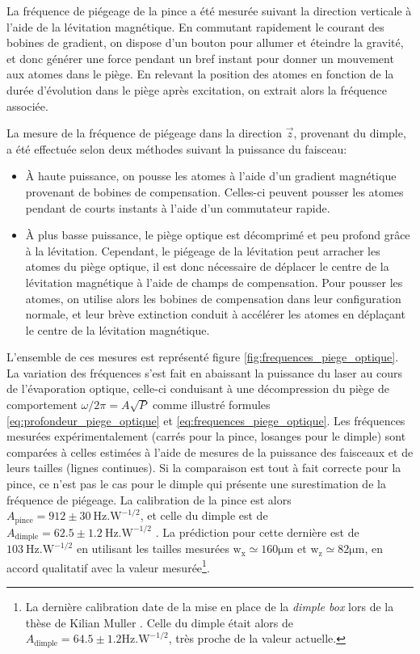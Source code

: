 La fréquence de piégeage de la pince a été mesurée suivant la direction verticale à l'aide de la lévitation magnétique. En commutant rapidement le courant des bobines de gradient, on dispose d'un bouton pour allumer et éteindre la gravité, et donc générer une force pendant un bref instant pour donner un mouvement aux atomes dans le piège. En relevant la position des atomes en fonction de la durée d'évolution dans le piège après excitation, on extrait alors la fréquence associée.

La mesure de la fréquence de piégeage dans la direction $\vec{z}$, provenant du dimple, a été effectuée selon deux méthodes suivant la puissance du faisceau:
\begin{itemize}
\item[\textendash] À haute puissance, on pousse les atomes à l'aide d'un gradient magnétique provenant de bobines de compensation. Celles-ci peuvent pousser les atomes pendant de courts instants à l'aide d'un commutateur rapide.
\item[\textendash] À plus basse puissance, le piège optique est décomprimé et peu profond grâce à la lévitation. Cependant, le piégeage de la lévitation peut arracher les atomes du piège optique, il est donc nécessaire de déplacer le centre de la lévitation magnétique à l'aide de champs de compensation. Pour pousser les atomes, on utilise alors les bobines de compensation dans leur configuration normale, et leur brève extinction conduit à accélérer les atomes en déplaçant le centre de la lévitation magnétique.
\end{itemize}

L'ensemble de ces mesures est représenté figure \ref{fig:frequences_piege_optique}. La variation des fréquences s'est fait en abaissant la puissance du laser au cours de l'évaporation optique, celle-ci conduisant à une décompression du piège de comportement $\omega /2\pi =A \sqrt{P}$ comme illustré formules \ref{eq:profondeur_piege_optique} et \ref{eq:frequences_piege_optique}. Les fréquences mesurées expérimentalement (carrés pour la pince, losanges pour le dimple) sont comparées à celles estimées à l'aide de mesures de la puissance des faisceaux et de leurs tailles (lignes continues). Si la comparaison est tout à fait correcte pour la pince, ce n'est pas le cas pour le dimple qui présente une surestimation de la fréquence de piégeage. La calibration de la pince est alors $A_{\mathrm{pince}}=912\pm 30 \: \mathrm{Hz.W^{-1/2}}$, et celle du dimple est de $A_{\mathrm{dimple}}=62.5\pm 1.2 \: \mathrm{Hz.W^{-1/2}}$ . La prédiction pour cette dernière est de $103 \: \mathrm{Hz.W^{-1/2}}$ en utilisant les tailles mesurées $\mathrm{w}_{\mathrm{x}} \simeq 160 \mathrm{\mu m}$ et $\mathrm{w}_{\mathrm{z}} \simeq 82 \mathrm{\mu m}$, en accord qualitatif avec la valeur mesurée\footnote{La dernière calibration date de la mise en place de la \emph{dimple box} lors de la thèse de Kilian Muller \citep{muller2015coherent}. Celle du dimple était alors de $A_{\mathrm{dimple}}=64.5\pm 1.2 \mathrm{Hz.W^{-1/2}}$, très proche de la valeur actuelle.}. 


